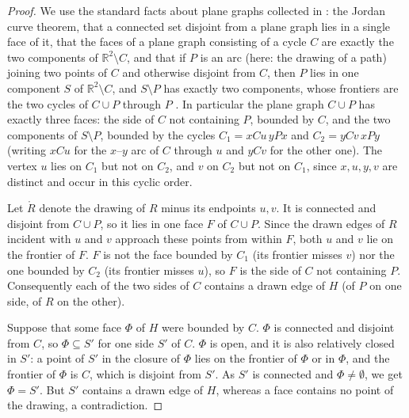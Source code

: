 \documentclass[11pt,a4paper]{article}
\theoremstyle{plain}
\theoremstyle{definition}
\theoremstyle{remark}
\begin{document}
\label{pf:jordan}
\lemjordan*
\begin{proof}
We use the standard facts about plane graphs collected in \cite[Section~4.1]{Diestel17}: the Jordan curve theorem, that a connected set disjoint from a plane graph lies in a single face of it, that the faces of a plane graph consisting of a cycle $C$ are exactly the two components of $\mathbb R^2\setminus C$, and that if $P$ is an arc (here: the drawing of a path) joining two points of $C$ and otherwise disjoint from $C$, then $P$ lies in one component $S$ of $\mathbb R^2\setminus C$, and $S\setminus P$ has exactly two components, whose frontiers are the two cycles of $C\cup P$ through $P$ \cite[Lemma~4.1.2]{Diestel17}. In particular the plane graph $C\cup P$ has exactly three faces: the side of $C$ not containing $P$, bounded by $C$, and the two components of $S\setminus P$, bounded by the cycles $C_1=xCu\,yPx$ and $C_2=yCv\,xPy$ (writing $xCu$ for the $x$--$y$ arc of $C$ through $u$ and $yCv$ for the other one). The vertex $u$ lies on $C_1$ but not on $C_2$, and $v$ on $C_2$ but not on $C_1$, since $x,u,y,v$ are distinct and occur in this cyclic order.

Let $\mathring R$ denote the drawing of $R$ minus its endpoints $u,v$. It is connected and disjoint from $C\cup P$, so it lies in one face $F$ of $C\cup P$. Since the drawn edges of $R$ incident with $u$ and $v$ approach these points from within $F$, both $u$ and $v$ lie on the frontier of $F$. $F$ is not the face bounded by $C_1$ (its frontier misses $v$) nor the one bounded by $C_2$ (its frontier misses $u$), so $F$ is the side of $C$ not containing $P$. Consequently each of the two sides of $C$ contains a drawn edge of $H$ (of $P$ on one side, of $R$ on the other).

Suppose that some face $\Phi$ of $H$ were bounded by $C$. $\Phi$ is connected and disjoint from $C$, so $\Phi\subseteq S'$ for one side $S'$ of $C$. $\Phi$ is open, and it is also relatively closed in $S'$: a point of $S'$ in the closure of $\Phi$ lies on the frontier of $\Phi$ or in $\Phi$, and the frontier of $\Phi$ is $C$, which is disjoint from $S'$. As $S'$ is connected and $\Phi\ne\emptyset$, we get $\Phi=S'$. But $S'$ contains a drawn edge of $H$, whereas a face contains no point of the drawing, a contradiction.
\end{proof}
\end{document}
